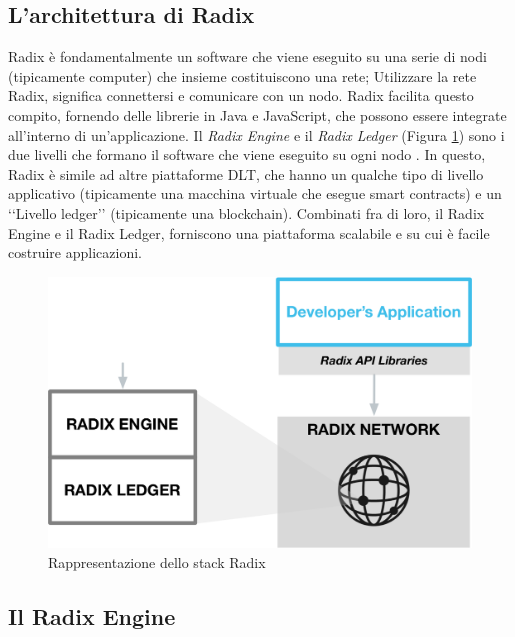 \subsection{L'architettura di Radix}

Radix è fondamentalmente un software che viene eseguito su una serie di nodi (tipicamente computer) che insieme costituiscono una rete; Utilizzare la rete Radix, significa connettersi e comunicare con un nodo. Radix facilita questo compito, fornendo delle librerie in Java e JavaScript, che possono essere integrate all'interno di un'applicazione. Il \textit{Radix Engine} e il \textit{Radix Ledger} (Figura \ref{fig:radix_stack}) sono i due livelli che formano il software che viene eseguito su ogni nodo \cite{K23}. In questo, Radix è simile ad altre piattaforme DLT, che hanno un qualche tipo di livello applicativo (tipicamente una macchina virtuale che esegue smart contracts) e un ‘‘Livello ledger’’ (tipicamente una blockchain). Combinati fra di loro, il Radix Engine e il Radix Ledger, forniscono una piattaforma scalabile e su cui è facile costruire applicazioni.

\begin{figure}[H]
    \includegraphics[width=\linewidth]{images/radix-stack.png}
    \caption{Rappresentazione dello stack Radix}
    \label{fig:radix_stack}
\end{figure}

\subsection{Il Radix Engine}

